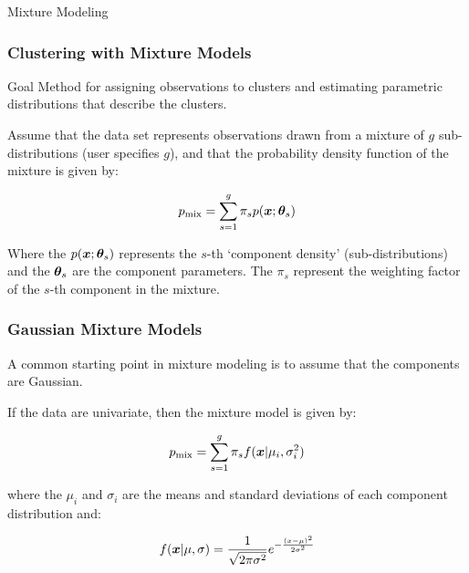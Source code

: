 \documentclass{beamer}
\begin{document}
\begin{frame}[plain,c]
\begin{center}
\Huge Mixture Modeling
\end{center}
\end{frame}



\begin{frame}
  \frametitle{Clustering with Mixture Models}

\begin{block}{Goal}
Method for assigning observations to clusters and estimating parametric distributions that describe the clusters.
\end{block}

    Assume that the data set represents observations drawn from a mixture of $g$ sub-distributions (user specifies $g$), and that the probability density function of the mixture is given by:

\[
p_{\mathrm{mix}} = \sum_{s=1}^g \pi_s p(\bm{x};\bm{\theta}_s)
\]

Where the $p(\bm{x};\bm{\theta}_s)$ represents the $s$-th `component density' (sub-distributions) and the $\bm{\theta}_s$ are the component parameters.  The $\pi_s$ represent the weighting factor of the $s$-th component in the mixture.

\end{frame}

{

}

\begin{frame}
  \frametitle{Gaussian Mixture Models}

A common starting point in mixture modeling is to assume that the components are Gaussian.

If the data are univariate, then the mixture model is given by:

\[
p_{\mathrm{mix}} = \sum_{s=1}^g \pi_s f(\bm{x}|\mu_i, \sigma_i^2)
\]

where the $\mu_i$ and $\sigma_i$ are the means and standard deviations of each component distribution and:

\[
f(\bm{x}|\mu, \sigma) = \frac{1}{\sqrt{2\pi\sigma^2}}e^{-\frac{(x-\mu)^2}{2\sigma^2}}
\]

\end{frame}
\end{document}
